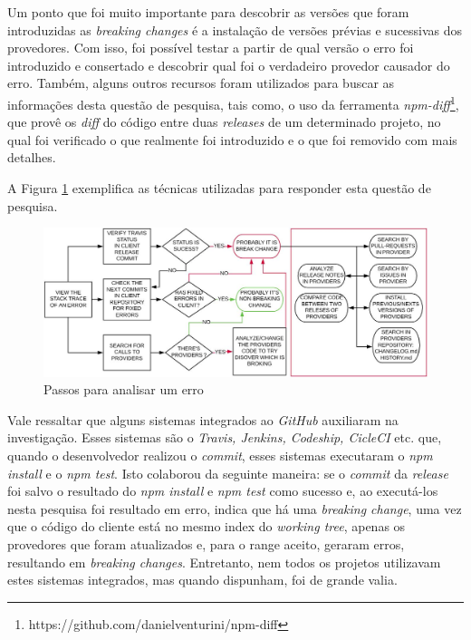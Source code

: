 Um ponto que foi muito importante para descobrir as versões que foram introduzidas as \textit{breaking changes} é a instalação de versões prévias e sucessivas dos provedores. Com isso, foi possível testar a partir de qual versão o erro foi introduzido e consertado e descobrir qual foi o verdadeiro provedor causador do erro. Também, alguns outros recursos foram utilizados para buscar as informações desta questão de pesquisa, tais como, o uso da ferramenta \textit{npm-diff}\footnote{https://github.com/danielventurini/npm-diff}, que provê os \textit{diff} do código entre duas \textit{releases} de um determinado projeto, no qual foi verificado o que realmente foi introduzido e o que foi removido com mais detalhes.

A Figura \ref{fig:step_analyze} exemplifica as técnicas utilizadas para responder esta questão de pesquisa.

\begin{figure}
    \centering
    \includegraphics[scale=0.35]{figuras/step_analyze.jpeg}
    \caption{Passos para analisar um erro}
    \label{fig:step_analyze}
\end{figure}

Vale ressaltar que alguns sistemas integrados ao \textit{GitHub} auxiliaram na investigação. Esses sistemas são o \textit{Travis, Jenkins, Codeship, CicleCI} etc. que, quando o desenvolvedor realizou o \textit{commit}, esses sistemas executaram o \textit{npm install} e o \textit{npm test}. Isto colaborou da seguinte maneira: se o \textit{commit} da \textit{release} foi salvo o resultado do \textit{npm install} e \textit{npm test} como sucesso e, ao executá-los nesta pesquisa foi resultado em erro, indica que há uma \textit{breaking change}, uma vez que o código do cliente está no mesmo index do \textit{working tree}, apenas os provedores que foram atualizados e, para o range aceito, geraram erros, resultando em \textit{breaking changes}. Entretanto, nem todos os projetos utilizavam estes sistemas integrados, mas quando dispunham, foi de grande valia.

